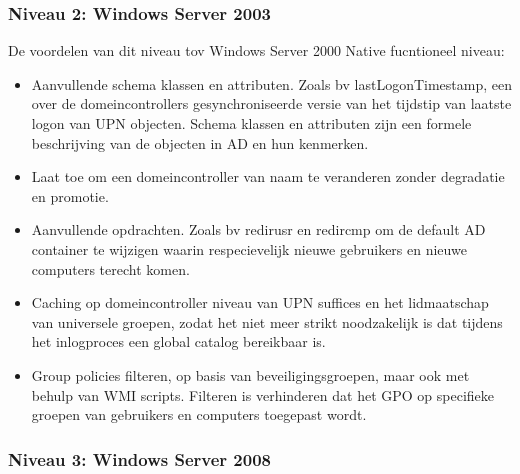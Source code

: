 \subsubsection{Niveau 2: Windows Server 2003}

De voordelen van dit niveau tov Windows Server 2000 Native fucntioneel niveau:
\begin{itemize}
	\item Aanvullende schema klassen en attributen. Zoals bv
		lastLogonTimestamp, een over de domeincontrollers
		gesynchroniseerde versie van het tijdstip van laatste logon van
		UPN objecten. Schema klassen en attributen zijn een formele
		beschrijving van de objecten in AD en hun kenmerken.
	\item Laat toe om een domeincontroller van naam te veranderen zonder
		degradatie en promotie.
	\item Aanvullende opdrachten. Zoals bv redirusr en redircmp om de
		default AD container te wijzigen waarin respecievelijk nieuwe
		gebruikers en nieuwe computers terecht komen.
	\item Caching op domeincontroller niveau van UPN suffices en het
		lidmaatschap van universele groepen, zodat het niet meer strikt
		noodzakelijk is dat tijdens het inlogproces een global catalog
		bereikbaar is.
	\item Group policies filteren, op basis van beveiligingsgroepen, maar
		ook met behulp van WMI scripts. Filteren is verhinderen dat het
		GPO op specifieke groepen van gebruikers en computers toegepast
		wordt.
\end{itemize}

\subsubsection{Niveau 3: Windows Server 2008}

